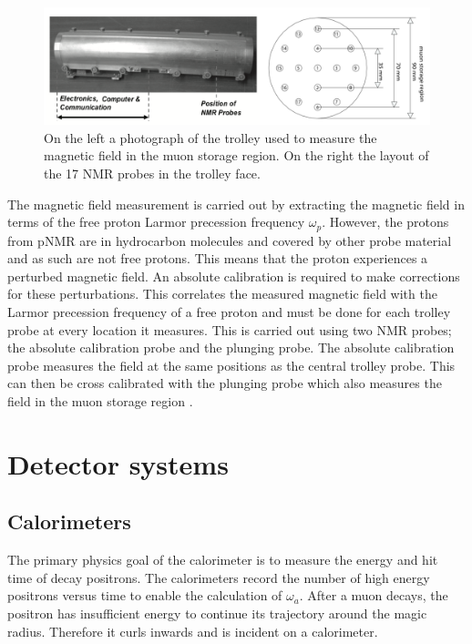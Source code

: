 \begin{figure}[th]
\centering
\includegraphics[scale=0.55]{Figures/trolleypic}
\decoRule
\caption{On the left a photograph of the trolley used to measure the magnetic field in the muon storage region. On the right the layout of the 17 NMR probes in the trolley face.}
\label{fig:trolleypic}
\end{figure}

The magnetic field measurement is carried out by extracting the magnetic field in terms of the free proton Larmor precession frequency $\omega{_p}$. However, the protons from pNMR are in hydrocarbon molecules and covered by other probe material and as such are not free protons. This means that the proton experiences a perturbed magnetic field. An absolute calibration is required to make corrections for these perturbations. This correlates the measured magnetic field with the Larmor precession frequency of a free proton and must be done for each trolley probe at every location it measures. This is carried out using two NMR probes; the absolute calibration probe and the plunging probe. The absolute calibration probe measures the field at the same positions as the central trolley probe. This can then be cross calibrated with the plunging probe which also measures the field in the muon storage region \cite{Reference22}.

\section{Detector systems}

\subsection{Calorimeters}

The primary physics goal of the calorimeter is to measure the energy and hit time of decay positrons. The calorimeters record the number of high energy positrons versus time to enable the calculation of $\omega_{a}$. After a muon decays, the positron has insufficient energy to continue its trajectory around the magic radius. Therefore it curls inwards and is incident on a calorimeter.

